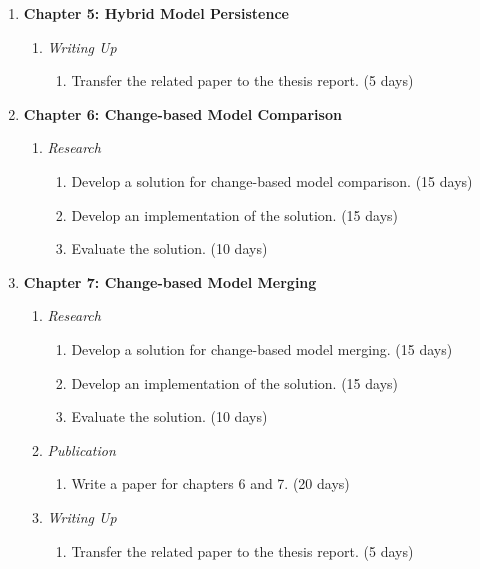 \documentclass[12pt, a4paper]{report} \usepackage[titletoc]{appendix}
\begin{document}
\begin{enumerate}
\begin{enumerate}
    \end{enumerate}
    \item \textbf{Chapter 5: Hybrid Model Persistence}
    \begin{enumerate}
        \item \textit{Writing Up}
        \begin{enumerate}
            \item Transfer the related paper to the thesis report. (5 days)
        \end{enumerate}
    \end{enumerate}
    \item \textbf{Chapter 6: Change-based Model Comparison}
    \begin{enumerate}
        \item \textit{Research}
        \begin{enumerate}
            \item Develop a solution for change-based model comparison. (15 days)
            \item Develop an implementation of the solution. (15 days)
            \item Evaluate the solution. (10 days)
        \end{enumerate}
    \end{enumerate}
    \item \textbf{Chapter 7: Change-based Model Merging}
    \begin{enumerate}
        \item \textit{Research}
        \begin{enumerate}
            \item Develop a solution for change-based model merging. (15 days)
            \item Develop an implementation of the solution. (15 days)
            \item Evaluate the solution. (10 days)
        \end{enumerate}
        \item \textit{Publication}
        \begin{enumerate}
            \item Write a paper for chapters 6 and 7. (20 days)
        \end{enumerate}
        \item \textit{Writing Up}
        \begin{enumerate}
            \item Transfer the related paper to the thesis report. (5 days)
        \end{enumerate}

\end{enumerate}
\end{enumerate}
\end{document}
